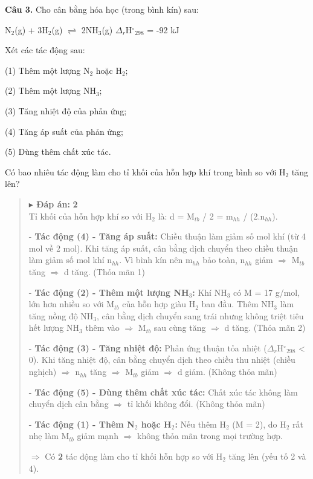 \documentclass[11pt,a4paper]{article}
\begin{document}
\textbf{Câu 3.} Cho cân bằng hóa học (trong bình kín) sau:

N$_{2}$(g) + 3H$_{2}$(g) $\rightleftharpoons$ 2NH$_{3}$(g)    $\Delta$$_{r}$H$^\circ$$_{298}$ = -92 kJ

Xét các tác động sau:

(1) Thêm một lượng N$_{2}$ hoặc H$_{2}$;

(2) Thêm một lượng NH$_{3}$;

(3) Tăng nhiệt độ của phản ứng;

(4) Tăng áp suất của phản ứng;

(5) Dùng thêm chất xúc tác.

Có bao nhiêu tác động làm cho tỉ khối của hỗn hợp khí trong bình so với H$_{2}$ tăng lên?


\begin{quote}\small
{\color{myBlue}\textbf{$\blacktriangleright$ Đáp án:}} \textbf{\color{red} 2}\\
Tỉ khối của hỗn hợp khí so với H$_{2}$ là: d = M$_{tb}$ / 2 = m$_{hh}$ / (2.n$_{hh}$).

- \textbf{Tác động (4) - Tăng áp suất:} Chiều thuận làm giảm số mol khí (từ 4 mol về 2 mol). Khi tăng áp suất, cân bằng dịch chuyển theo chiều thuận làm giảm số mol khí n$_{hh}$. Vì bình kín nên m$_{hh}$ bảo toàn, n$_{hh}$ giảm $\Rightarrow$ M$_{tb}$ tăng $\Rightarrow$ d tăng. (Thỏa mãn 1)

- \textbf{Tác động (2) - Thêm một lượng NH$_{3}$:} Khí NH$_{3}$ có M = 17 g/mol, lớn hơn nhiều so với M$_{tb}$ của hỗn hợp giàu H$_{2}$ ban đầu. Thêm NH$_{3}$ làm tăng nồng độ NH$_{3}$, cân bằng dịch chuyển sang trái nhưng không triệt tiêu hết lượng NH$_{3}$ thêm vào $\Rightarrow$ M$_{tb}$ sau cùng tăng $\Rightarrow$ d tăng. (Thỏa mãn 2)

- \textbf{Tác động (3) - Tăng nhiệt độ:} Phản ứng thuận tỏa nhiệt ($\Delta$$_{r}$H$^\circ$$_{298}$ < 0). Khi tăng nhiệt độ, cân bằng chuyển dịch theo chiều thu nhiệt (chiều nghịch) $\Rightarrow$ n$_{hh}$ tăng $\Rightarrow$ M$_{tb}$ giảm $\Rightarrow$ d giảm. (Không thỏa mãn)

- \textbf{Tác động (5) - Dùng thêm chất xúc tác:} Chất xúc tác không làm chuyển dịch cân bằng $\Rightarrow$ tỉ khối không đổi. (Không thỏa mãn)

- \textbf{Tác động (1) - Thêm N$_{2}$ hoặc H$_{2}$:} Nếu thêm H$_{2}$ (M = 2), do H$_{2}$ rất nhẹ làm M$_{tb}$ giảm mạnh $\Rightarrow$ không thỏa mãn trong mọi trường hợp.

$\Rightarrow$ Có \textbf{2} tác động làm cho tỉ khối hỗn hợp so với H$_{2}$ tăng lên (yếu tố 2 và 4).
\end{quote}
\vspace{2pt}
\end{document}
